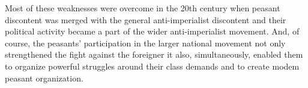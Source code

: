 \begin{multicols}{2}
Most of these weaknesses were overcome in the 20th century when peasant discontent was merged with the general anti-imperialist discontent and their political activity became a part of the wider anti-imperialist movement. And, of course, the peasants' participation in the larger national movement not only strengthened the fight against the foreigner it also, simultaneously, enabled them to organize powerful struggles around their class demands and to create modem peasant organization.
\end{multicols}